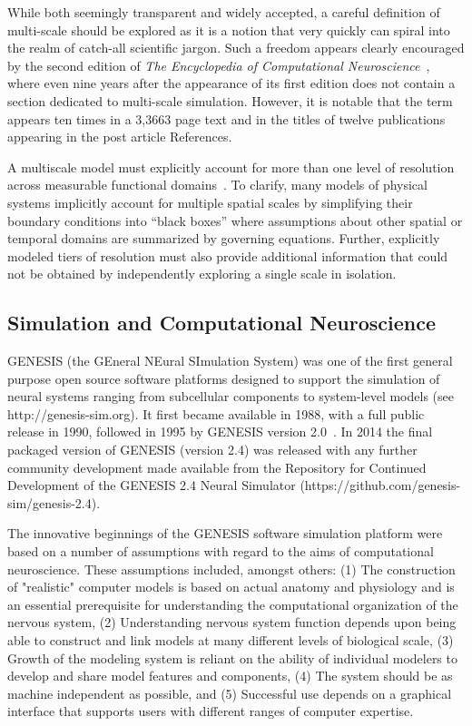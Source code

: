 \documentclass{article}
\begin{document}
While both seemingly transparent and widely accepted, a careful definition of multi-scale should be explored as it is a notion that very quickly can spiral into the realm of catch-all scientific jargon. Such a freedom appears clearly encouraged by the second edition of \textit{The Encyclopedia of Computational Neuroscience}~\cite{jung22}, where even nine years after the appearance of its first edition does not contain a section dedicated to multi-scale simulation. However, it is notable that the term appears ten times in a 3,3663 page text and in the titles of twelve publications appearing in the post article References.

A multiscale model must explicitly account for more than one level of resolution across measurable functional domains~\cite{walpole13}. To clarify, many models of physical systems implicitly account for multiple spatial scales by simplifying their boundary conditions into “black boxes” where assumptions about other spatial or temporal domains are summarized by governing equations. Further, explicitly modeled tiers of resolution must also provide additional information that could not be obtained by independently exploring a single scale in isolation.

\subsection{Simulation and Computational Neuroscience}

GENESIS (the GEneral NEural SImulation System) was one of the first general purpose open source software platforms designed to support the simulation of neural systems ranging from subcellular components to system-level models (see http://genesis-sim.org). It first became available in 1988, with a full public release in 1990, followed in 1995 by GENESIS version 2.0~\cite{jung22}. In 2014 the final packaged version of GENESIS (version 2.4) was released with any further community development made available from the Repository for Continued Development of the GENESIS 2.4 Neural Simulator (https://github.com/genesis-sim/genesis-2.4).

The innovative beginnings of the GENESIS software simulation platform were based on a number of assumptions with regard to the aims of computational neuroscience. These assumptions included, amongst others: (1) The construction of "realistic" computer models is based on actual anatomy and physiology and is an essential prerequisite for understanding the computational organization of the nervous system, (2) Understanding nervous system function depends upon being able to construct and link models at many different levels of biological scale, (3) Growth of the modeling system is reliant on the ability of individual modelers to develop and share model features and components, (4) The system should be as machine independent as possible, and (5) Successful use depends on a graphical interface that supports users with different ranges of computer expertise.
\end{document}
